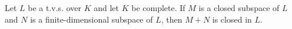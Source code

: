 Let $L$ be a t.v.s. over $K$ and let $K$ be complete. If $M$ is a closed subspace of $L$ and $N$ is a finite-dimensional subspace of $L$, then $M + N$ is closed in $L$.
